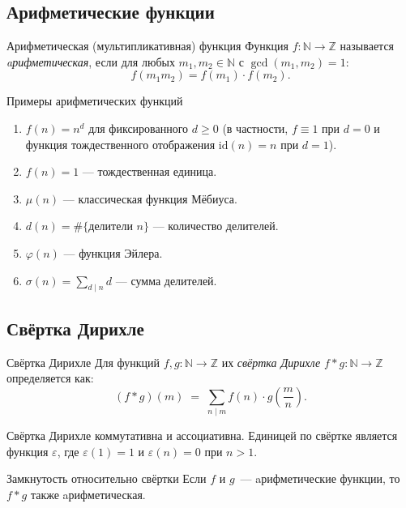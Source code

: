\subsection{Арифметические функции}

\begin{Definition}{ Арифметическая (мультипликативная) функция}{}
	Функция $f \colon \mathbb{N} \to \mathbb{Z}$ называется
	\emph{aрифметическая}, если для любых
	$m_1, m_2 \in \mathbb{N}$ с $\gcd(m_1, m_2) = 1$:
	\[
	f(m_1 m_2) = f(m_1)\cdot f(m_2).
	\]
\end{Definition}

\begin{Example}{Примеры арифметических функций}{}
	\begin{enumerate}
		\item $f(n) = n^d$ для фиксированного $d \geq 0$ (в частности, $f \equiv 1$ при $d=0$
		и функция тождественного отображения $\mathrm{id}(n) = n$ при $d=1$).
		\item $f(n) = 1$ --- тождественная единица.
		\item $\mu(n)$ --- классическая функция Мёбиуса.
		\item $d(n) = \#\{\text{делители }n\}$ --- количество делителей.
		\item $\varphi(n)$ --- функция Эйлера.
		\item $\sigma(n) = \sum_{d \mid n} d$ --- сумма делителей.
	\end{enumerate}
\end{Example}

\subsection{Свёртка Дирихле}

\begin{Definition}{Свёртка Дирихле}{}
	Для функций $f, g \colon \mathbb{N} \to \mathbb{Z}$ их
	\emph{свёртка Дирихле} $f * g \colon \mathbb{N} \to \mathbb{Z}$ определяется как:
	\[
	(f * g)(m) \;=\; \sum_{n \mid m} f(n)\cdot g\!\left(\frac{m}{n}\right).
	\]
\end{Definition}

\begin{Remark}{}{}
	Свёртка Дирихле коммутативна и ассоциативна. Единицей по свёртке является
	функция $\varepsilon$, где $\varepsilon(1) = 1$ и $\varepsilon(n) = 0$ при $n > 1$.
\end{Remark}

\begin{Theorem}{Замкнутость относительно свёртки}{}
	Если $f$ и $g$~--- aрифметические функции, то $f * g$ также aрифметическая.
\end{Theorem}


